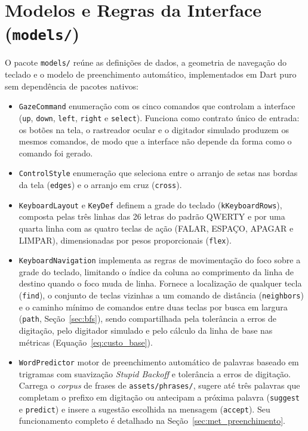   \section{Modelos e Regras da Interface (\texttt{models/})}

O pacote \texttt{models/} reúne as definições de dados, a geometria de navegação do teclado e o modelo de preenchimento automático, implementados em Dart puro sem dependência de pacotes nativos:

\begin{itemize}
    \item \texttt{GazeCommand}
    enumeração com os cinco comandos que controlam a interface (\texttt{up}, \texttt{down}, \texttt{left}, \texttt{right} e \texttt{select}). Funciona como contrato único de entrada: os botões na tela, o rastreador ocular e o digitador simulado produzem os mesmos comandos, de modo que a interface não depende da forma como o comando foi gerado.
    \item \texttt{ControlStyle}
    enumeração que seleciona entre o arranjo de setas nas bordas da tela (\texttt{edges}) e o arranjo em cruz (\texttt{cross}).
    \item \texttt{KeyboardLayout} e \texttt{KeyDef}
    definem a grade do teclado (\texttt{kKeyboardRows}), composta pelas três linhas das 26 letras do padrão QWERTY e por uma quarta linha com as quatro teclas de ação (FALAR, ESPAÇO, APAGAR e LIMPAR), dimensionadas por pesos proporcionais (\texttt{flex}).
    \item \texttt{KeyboardNavigation}
    implementa as regras de movimentação do foco sobre a grade do teclado, limitando o índice da coluna ao comprimento da linha de destino quando o foco muda de linha. Fornece a localização de qualquer tecla (\texttt{find}), o conjunto de teclas vizinhas a um comando de distância (\texttt{neighbors}) e o caminho mínimo de comandos entre duas teclas por busca em largura (\texttt{path}, Seção~\ref{sec:bfs}), sendo compartilhada pela tolerância a erros de digitação, pelo digitador simulado e pelo cálculo da linha de base nas métricas (Equação~\ref{eq:custo_base}).
    \item \texttt{WordPredictor}
    motor de preenchimento automático de palavras baseado em trigramas com suavização \textit{Stupid Backoff} e tolerância a erros de digitação. Carrega o \textit{corpus} de frases de \texttt{assets/phrases/}, sugere até três palavras que completam o prefixo em digitação ou antecipam a próxima palavra (\texttt{suggest} e \texttt{predict}) e insere a sugestão escolhida na mensagem (\texttt{accept}). Seu funcionamento completo é detalhado na Seção~\ref{sec:met_preenchimento}.
\end{itemize}
